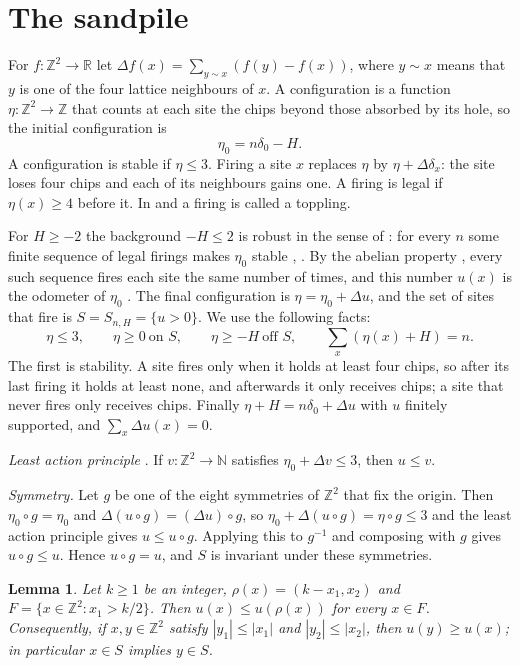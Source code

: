 \documentclass[11pt]{amsart}
\newtheorem{lemma}[theorem]{Lemma}
\theoremstyle{remark}
\numberwithin{equation}{section}
\newcommand{\Z}{\mathbb Z}
\newcommand{\R}{\mathbb R}
\newcommand{\N}{\mathbb N}
\begin{document}
\section{The sandpile}\label{sec:sandpile}

For $f\colon\Z^2\to\R$ let $\Delta f(x)=\sum_{y\sim x}(f(y)-f(x))$, where $y\sim x$ means that $y$ is one of the four lattice neighbours of $x$. A configuration is a function $\eta\colon\Z^2\to\Z$ that counts at each site the chips beyond those absorbed by its hole, so the initial configuration is
\[
\eta_0=n\delta_0-H.
\]
A configuration is stable if $\eta\le3$. Firing a site $x$ replaces $\eta$ by $\eta+\Delta\delta_x$: the site loses four chips and each of its neighbours gains one. A firing is legal if $\eta(x)\ge4$ before it. In \cite{FLP} and \cite{LP} a firing is called a toppling.

For $H\ge-2$ the background $-H\le2$ is robust in the sense of \cite{FLP}: for every $n$ some finite sequence of legal firings makes $\eta_0$ stable \cite{FR}, \cite[Section~1]{FLP}. By the abelian property \cite{Dha90}, \cite[Lemma~2.1]{FLP} every such sequence fires each site the same number of times, and this number $u(x)$ is the odometer of $\eta_0$ \cite[(2)]{FLP}. The final configuration is $\eta=\eta_0+\Delta u$, and the set of sites that fire is $S=S_{n,H}=\{u>0\}$. We use the following facts:
\begin{equation}\label{eq:heights}
\eta\le3,\qquad\eta\ge0\ \text{on }S,\qquad\eta\ge-H\ \text{off }S,\qquad\sum_{x}(\eta(x)+H)=n.
\end{equation}
The first is stability. A site fires only when it holds at least four chips, so after its last firing it holds at least none, and afterwards it only receives chips; a site that never fires only receives chips. Finally $\eta+H=n\delta_0+\Delta u$ with $u$ finitely supported, and $\sum_x\Delta u(x)=0$.

\emph{Least action principle} \cite[Lemma~2.3]{FLP}. If $v\colon\Z^2\to\N$ satisfies $\eta_0+\Delta v\le3$, then $u\le v$.

\emph{Symmetry.} Let $g$ be one of the eight symmetries of $\Z^2$ that fix the origin. Then $\eta_0\circ g=\eta_0$ and $\Delta(u\circ g)=(\Delta u)\circ g$, so $\eta_0+\Delta(u\circ g)=\eta\circ g\le3$ and the least action principle gives $u\le u\circ g$. Applying this to $g^{-1}$ and composing with $g$ gives $u\circ g\le u$. Hence $u\circ g=u$, and $S$ is invariant under these symmetries.

\begin{lemma}\label{lem:reflection}
Let $k\ge1$ be an integer, $\rho(x)=(k-x_1,x_2)$ and $F=\{x\in\Z^2:x_1>k/2\}$. Then $u(x)\le u(\rho(x))$ for every $x\in F$. Consequently, if $x,y\in\Z^2$ satisfy $|y_1|\le|x_1|$ and $|y_2|\le|x_2|$, then $u(y)\ge u(x)$; in particular $x\in S$ implies $y\in S$.
\end{lemma}
\end{document}
